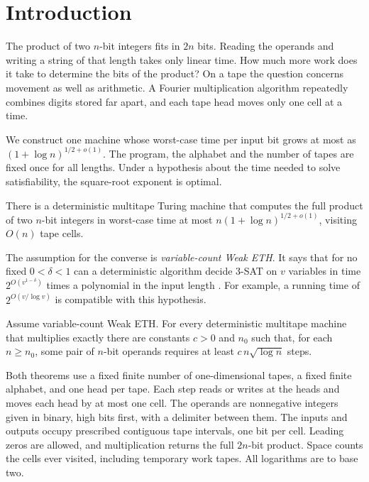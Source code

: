 \section{Introduction}\label{sec:intro}

The product of two $n$-bit integers fits in $2n$ bits. Reading the
operands and writing a string of that length takes only linear time.
How much more work does it take to determine the bits of the product?
On a tape the question concerns movement as well as arithmetic. A
Fourier multiplication algorithm repeatedly combines digits stored
far apart, and each tape head moves only one cell at a time.

We construct one machine whose worst-case time per input bit grows
at most as $(1+\log n)^{1/2+o(1)}$. The program, the alphabet and the
number of tapes are fixed once for all lengths. Under a hypothesis
about the time needed to solve satisfiability, the square-root
exponent is optimal.

\begin{theorem}\label{thm:uniform-main}
There is a deterministic multitape Turing machine that computes the
full product of two $n$-bit integers in worst-case time at most
$n(1+\log n)^{1/2+o(1)}$, visiting $O(n)$ tape cells.
\end{theorem}

The assumption for the converse is \emph{variable-count Weak ETH}.
It says that for no fixed $0<\delta<1$ can a deterministic algorithm
decide 3-SAT on $v$ variables in time
$2^{O(v^{1-\delta})}$ times a polynomial in the input length
\cite{SH,WeakSH}. For example, a running time of $2^{O(v/\log v)}$
is compatible with this hypothesis.

\begin{theorem}\label{thm:lower}
Assume variable-count Weak ETH. For every deterministic multitape
machine that multiplies exactly there are constants $c>0$ and $n_0$
such that, for each $n\ge n_0$, some pair of $n$-bit operands
requires at least $c\,n\sqrt{\log n}$ steps.
\end{theorem}

Both theorems use a fixed finite number of one-dimensional tapes, a
fixed finite alphabet, and one head per tape. Each step reads or
writes at the heads and moves each head by at most one cell. The
operands are nonnegative integers given in binary, high bits first,
with a delimiter between them. The inputs and outputs occupy
prescribed contiguous tape intervals, one bit per cell. Leading
zeros are allowed, and multiplication returns the full $2n$-bit
product. Space counts the cells ever visited, including temporary
work tapes. All logarithms are to base two.

